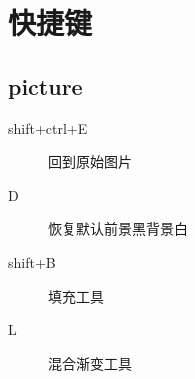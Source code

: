 \section{快捷键}
\subsection{picture}
\begin{description}
\item[shift+ctrl+E] 回到原始图片
\item[D]		恢复默认前景黑背景白
\item[shift+B]	填充工具
\item[L]		混合渐变工具
\end{description}





\clearpage